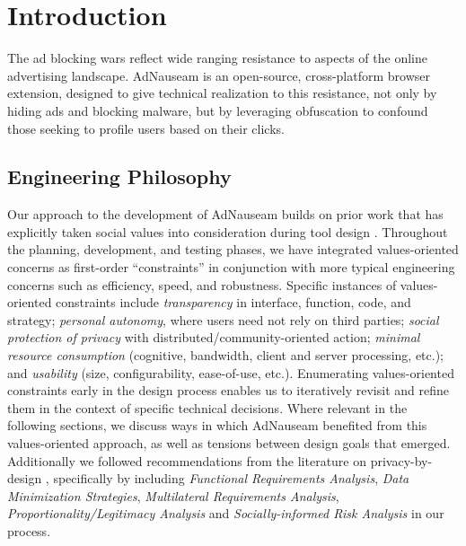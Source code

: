 \documentclass[conference]{IEEEtran}
\begin{document}

\section{Introduction}
The ad blocking wars \cite{Nytimes} reflect wide ranging resistance to aspects of the online advertising landscape. AdNauseam is an open-source, cross-platform browser extension, designed to give technical realization to this resistance, not only by hiding ads and blocking malware, but by leveraging obfuscation to confound those seeking to profile users based on their clicks.

\subsection{Engineering Philosophy}

Our approach to the development of AdNauseam builds on prior work that has explicitly taken social values into consideration during tool design \cite{Friedman,Flanagan,Howe-1}. Throughout the planning, development, and testing phases, we have integrated values-oriented concerns as first-order ``constraints'' in conjunction with more typical engineering concerns such as efficiency, speed, and robustness. Specific instances of values-oriented constraints include \emph{transparency} in interface, function, code, and strategy; \emph{personal autonomy}, where users need not rely on third parties; \emph{social protection of privacy} with distributed/community-oriented action; \emph{minimal resource consumption} (cognitive, bandwidth, client and server processing, etc.); and \emph{usability} (size, configurability, ease-of-use, etc.). Enumerating values-oriented constraints early in the design process enables us to iteratively revisit and refine them in the context of specific technical decisions. Where relevant in the following sections, we discuss ways in which AdNauseam benefited from this values-oriented approach, as well as tensions between design goals that emerged.
\\

Additionally we followed recommendations from the literature on privacy-by-design \cite{Gurses-0, Hoepman, Gurses-1}, specifically by including \emph{Functional Requirements Analysis}, \emph{Data Minimization Strategies}, \emph{Multilateral Requirements Analysis},  \emph{Proportionality/Legitimacy Analysis} and \emph{Socially-informed Risk Analysis} in our process.
\end{document}
